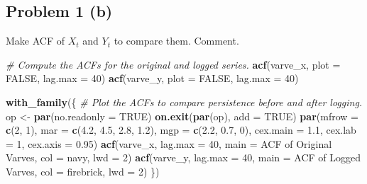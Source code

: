 \documentclass[
  10pt,
]{extarticle}
\newenvironment{Shaded}{\begin{snugshade}}{\end{snugshade}}
\newcommand{\AttributeTok}[1]{\textcolor[rgb]{0.13,0.29,0.53}{#1}}
\newcommand{\CommentTok}[1]{\textcolor[rgb]{0.56,0.35,0.01}{\textit{#1}}}
\newcommand{\ConstantTok}[1]{\textcolor[rgb]{0.56,0.35,0.01}{#1}}
\newcommand{\DecValTok}[1]{\textcolor[rgb]{0.00,0.00,0.81}{#1}}
\newcommand{\FloatTok}[1]{\textcolor[rgb]{0.00,0.00,0.81}{#1}}
\newcommand{\FunctionTok}[1]{\textcolor[rgb]{0.13,0.29,0.53}{\textbf{#1}}}
\newcommand{\NormalTok}[1]{#1}
\newcommand{\OtherTok}[1]{\textcolor[rgb]{0.56,0.35,0.01}{#1}}
\newcommand{\StringTok}[1]{\textcolor[rgb]{0.31,0.60,0.02}{#1}}
\begin{document}
\newpage

\subsection{Problem 1 (b)}\label{problem-1-b}

\begin{problem}[Problem 1 (b)]
Make ACF of \(X_t\) and \(Y_t\) to compare them. Comment.
\end{problem}

\begin{Shaded}
\begin{Highlighting}[]
\CommentTok{\# Compute the ACFs for the original and logged series.}
\FunctionTok{acf}\NormalTok{(varve\_x, }\AttributeTok{plot =} \ConstantTok{FALSE}\NormalTok{, }\AttributeTok{lag.max =} \DecValTok{40}\NormalTok{)}
\FunctionTok{acf}\NormalTok{(varve\_y, }\AttributeTok{plot =} \ConstantTok{FALSE}\NormalTok{, }\AttributeTok{lag.max =} \DecValTok{40}\NormalTok{)}
\end{Highlighting}
\end{Shaded}

\begin{Shaded}
\begin{Highlighting}[]
\FunctionTok{with\_family}\NormalTok{(\{}
  \CommentTok{\# Plot the ACFs to compare persistence before and after logging.}
\NormalTok{  op }\OtherTok{\textless{}{-}} \FunctionTok{par}\NormalTok{(}\AttributeTok{no.readonly =} \ConstantTok{TRUE}\NormalTok{)}
  \FunctionTok{on.exit}\NormalTok{(}\FunctionTok{par}\NormalTok{(op), }\AttributeTok{add =} \ConstantTok{TRUE}\NormalTok{)}
  \FunctionTok{par}\NormalTok{(}\AttributeTok{mfrow =} \FunctionTok{c}\NormalTok{(}\DecValTok{2}\NormalTok{, }\DecValTok{1}\NormalTok{), }\AttributeTok{mar =} \FunctionTok{c}\NormalTok{(}\FloatTok{4.2}\NormalTok{, }\FloatTok{4.5}\NormalTok{, }\FloatTok{2.8}\NormalTok{, }\FloatTok{1.2}\NormalTok{), }\AttributeTok{mgp =} \FunctionTok{c}\NormalTok{(}\FloatTok{2.2}\NormalTok{, }\FloatTok{0.7}\NormalTok{, }\DecValTok{0}\NormalTok{), }\AttributeTok{cex.main =} \FloatTok{1.1}\NormalTok{, }\AttributeTok{cex.lab =} \DecValTok{1}\NormalTok{, }\AttributeTok{cex.axis =} \FloatTok{0.95}\NormalTok{)}
  \FunctionTok{acf}\NormalTok{(varve\_x, }\AttributeTok{lag.max =} \DecValTok{40}\NormalTok{, }\AttributeTok{main =} \StringTok{\textquotesingle{}ACF of Original Varves\textquotesingle{}}\NormalTok{, }\AttributeTok{col =} \StringTok{\textquotesingle{}navy\textquotesingle{}}\NormalTok{, }\AttributeTok{lwd =} \DecValTok{2}\NormalTok{)}
  \FunctionTok{acf}\NormalTok{(varve\_y, }\AttributeTok{lag.max =} \DecValTok{40}\NormalTok{, }\AttributeTok{main =} \StringTok{\textquotesingle{}ACF of Logged Varves\textquotesingle{}}\NormalTok{, }\AttributeTok{col =} \StringTok{\textquotesingle{}firebrick\textquotesingle{}}\NormalTok{, }\AttributeTok{lwd =} \DecValTok{2}\NormalTok{)}
\NormalTok{\})}
\end{Highlighting}
\end{Shaded}
\end{document}
